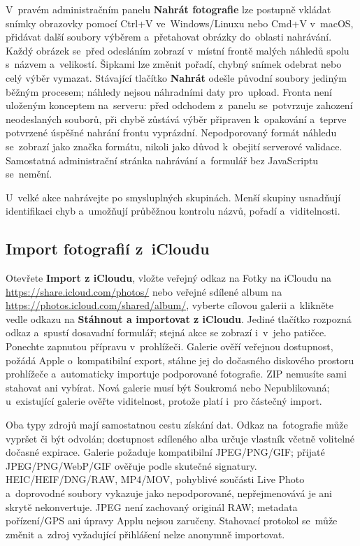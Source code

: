 \documentclass[11pt,a4paper]{article}
\newcommand{\ui}[1]{\textbf{#1}}
\begin{document}
V~pravém administračním panelu \ui{Nahrát fotografie} lze postupně vkládat
snímky obrazovky pomocí Ctrl+V ve~Windows/Linuxu nebo Cmd+V v~macOS, přidávat
další soubory výběrem a~přetahovat obrázky do~oblasti nahrávání. Každý obrázek
se~před odesláním zobrazí v~místní frontě malých náhledů spolu s~názvem
a~velikostí. Šipkami lze změnit pořadí, chybný snímek odebrat nebo celý výběr
vymazat. Stávající tlačítko \ui{Nahrát} odešle původní soubory jediným běžným
procesem; náhledy nejsou náhradními daty pro~upload. Fronta není uloženým
konceptem na~serveru: před odchodem z~panelu se~potvrzuje zahození neodeslaných
souborů, při chybě zůstává výběr připraven k~opakování a~teprve potvrzené
úspěšné nahrání frontu vyprázdní. Nepodporovaný formát náhledu se~zobrazí jako
značka formátu, nikoli jako důvod k~obejití serverové validace. Samostatná
administrační stránka nahrávání a~formulář bez JavaScriptu se~nemění.

U~velké akce nahrávejte po smysluplných skupinách. Menší skupiny usnadňují
identifikaci chyb a~umožňují průběžnou kontrolu názvů, pořadí a~viditelnosti.


\subsection{Import fotografií z~iCloudu}
Otevřete \ui{Import z iCloudu}, vložte veřejný odkaz na Fotky na iCloudu na
\url{https://share.icloud.com/photos/} nebo veřejné sdílené album na
\url{https://photos.icloud.com/shared/album/}, vyberte cílovou galerii
a~klikněte vedle odkazu na \ui{Stáhnout a importovat z iCloudu}. Jediné tlačítko
rozpozná odkaz a~spustí dosavadní formulář; stejná akce se zobrazí i~v~jeho
patičce. Ponechte zapnutou přípravu v~prohlížeči. Galerie ověří veřejnou
dostupnost, požádá Apple o~kompatibilní export, stáhne jej do dočasného
diskového prostoru prohlížeče a~automaticky importuje podporované fotografie.
ZIP nemusíte sami stahovat ani vybírat. Nová galerie musí být Soukromá nebo
Nepublikovaná; u~existující galerie ověřte viditelnost, protože platí i~pro
částečný import.

Oba typy zdrojů mají samostatnou cestu získání dat. Odkaz na~fotografie může
vypršet či být odvolán; dostupnost sdíleného alba určuje vlastník včetně
volitelné dočasné expirace. Galerie požaduje kompatibilní JPEG/PNG/GIF; přijaté
JPEG/PNG/WebP/GIF ověřuje podle skutečné signatury. HEIC/HEIF/DNG/RAW, MP4/MOV,
pohyblivé součásti Live Photo a~doprovodné soubory vykazuje jako nepodporované,
nepřejmenovává je ani skrytě nekonvertuje. JPEG není zachovaný originál RAW;
metadata pořízení/GPS ani úpravy Applu nejsou zaručeny. Stahovací protokol
se~může změnit a~zdroj vyžadující přihlášení nelze anonymně importovat.
\end{document}
